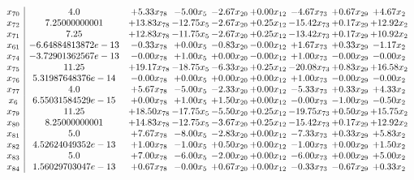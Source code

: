 \documentclass[8pt]{article}
\begin{document}
\[\begin{array}{c| c c@{\hskip 2pt} c@{\hskip 2pt} c@{\hskip 2pt} c@{\hskip 2pt} c@{\hskip 2pt} c@{\hskip 2pt} c@{\hskip 2pt} }
 x_{70}   &  4.0 & +  5.33 x_{78} & -5.00 x_{5} & -2.67 x_{20} & +  0.00 x_{12} & -4.67 x_{73} & +  0.67 x_{29} & +  4.67 x_{2}\\
 x_{72}   &  7.25000000001 & + 13.83 x_{78} & -12.75 x_{5} & -2.67 x_{20} & +  0.25 x_{12} & -15.42 x_{73} & +  0.17 x_{29} & + 12.92 x_{2}\\
 x_{71}   &  7.25 & + 12.83 x_{78} & -11.75 x_{5} & -2.67 x_{20} & +  0.25 x_{12} & -13.42 x_{73} & +  0.17 x_{29} & + 10.92 x_{2}\\
 x_{61}   &  -6.64884813872e-13 & -0.33 x_{78} & +  0.00 x_{5} & -0.83 x_{20} & -0.00 x_{12} & +  1.67 x_{73} & +  0.33 x_{29} & -1.17 x_{2}\\
 x_{74}   &  -3.72901362567e-13 & -0.00 x_{78} & +  1.00 x_{5} & +  0.00 x_{20} & -0.00 x_{12} & +  1.00 x_{73} & -0.00 x_{29} & -0.00 x_{2}\\
 x_{75}   &  11.25 & + 19.17 x_{78} & -18.75 x_{5} & -6.33 x_{20} & +  0.25 x_{12} & -20.08 x_{73} & +  0.83 x_{29} & + 16.58 x_{2}\\
 x_{76}   &  5.31987648376e-14 & -0.00 x_{78} & +  0.00 x_{5} & +  0.00 x_{20} & +  0.00 x_{12} & +  1.00 x_{73} & -0.00 x_{29} & -0.00 x_{2}\\
 x_{77}   &  4.0 & +  5.67 x_{78} & -5.00 x_{5} & -2.33 x_{20} & +  0.00 x_{12} & -5.33 x_{73} & +  0.33 x_{29} & +  4.33 x_{2}\\
 x_{6}   &  6.55031584529e-15 & +  0.00 x_{78} & +  1.00 x_{5} & +  1.50 x_{20} & +  0.00 x_{12} & -0.00 x_{73} & -1.00 x_{29} & -0.50 x_{2}\\
 x_{79}   &  11.25 & + 18.50 x_{78} & -17.75 x_{5} & -5.50 x_{20} & +  0.25 x_{12} & -19.75 x_{73} & +  0.50 x_{29} & + 15.75 x_{2}\\
 x_{80}   &  8.25000000001 & + 14.83 x_{78} & -12.75 x_{5} & -3.67 x_{20} & +  0.25 x_{12} & -15.42 x_{73} & +  0.17 x_{29} & + 12.92 x_{2}\\
 x_{81}   &  5.0 & +  7.67 x_{78} & -8.00 x_{5} & -2.83 x_{20} & +  0.00 x_{12} & -7.33 x_{73} & +  0.33 x_{29} & +  5.83 x_{2}\\
 x_{82}   &  4.52624049352e-13 & +  1.00 x_{78} & -1.00 x_{5} & +  0.50 x_{20} & +  0.00 x_{12} & -1.00 x_{73} & +  0.00 x_{29} & +  1.50 x_{2}\\
 x_{83}   &  5.0 & +  7.00 x_{78} & -6.00 x_{5} & -2.00 x_{20} & +  0.00 x_{12} & -6.00 x_{73} & +  0.00 x_{29} & +  5.00 x_{2}\\
 x_{84}   &  1.56029703047e-13 & +  0.67 x_{78} & -0.00 x_{5} & +  0.67 x_{20} & +  0.00 x_{12} & -0.33 x_{73} & -0.67 x_{29} & +  0.33 x_{2}\\

\end{array}\]
\end{document}
